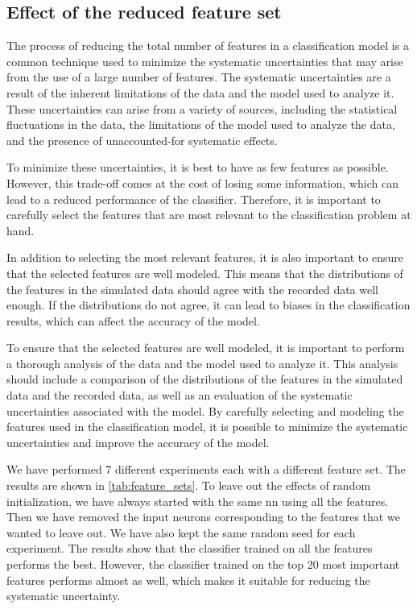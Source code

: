\subsection{Effect of the reduced feature set}

The process of reducing the total number of features in a classification model is a common technique used to minimize
the systematic uncertainties that may arise from the use of a large number of features. The systematic uncertainties are
a result of the inherent limitations of the data and the model used to analyze it. These uncertainties can arise from a
variety of sources, including the statistical fluctuations in the data, the limitations of the model used to analyze the
data, and the presence of unaccounted-for systematic effects.

To minimize these uncertainties, it is best to have as few features as possible. However, this trade-off comes at the
cost of losing some information, which can lead to a reduced performance of the classifier. Therefore, it is important
to carefully select the features that are most relevant to the classification problem at hand.

In addition to selecting the most relevant features, it is also important to ensure that the selected features are well
modeled. This means that the distributions of the features in the simulated data should agree with the recorded data
well enough. If the distributions do not agree, it can lead to biases in the classification results, which can affect
the accuracy of the model.

To ensure that the selected features are well modeled, it is important to perform a thorough analysis of the data and
the model used to analyze it. This analysis should include a comparison of the distributions of the features in the
simulated data and the recorded data, as well as an evaluation of the systematic uncertainties associated with the
model. By carefully selecting and modeling the features used in the classification model, it is possible to minimize the
systematic uncertainties and improve the accuracy of the model.

We have performed 7 different experiments each with a different feature set. The results are shown in
\autoref{tab:feature_sets}. To leave out the effects of random initialization, we have always started with the same
\gls{nn} using all the features. Then we have removed the input neurons corresponding to the features that we wanted to
leave out. We have also kept the same random seed for each experiment. The results show that the classifier trained on
all the features performs the best. However, the classifier trained on the top 20 most important features performs
almost as well, which makes it suitable for reducing the systematic uncertainty.

